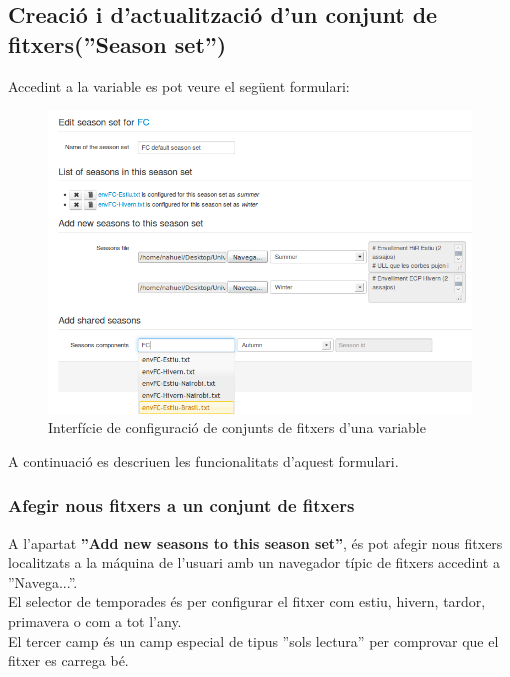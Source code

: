 \subsection{Creació i d'actualització d'un conjunt de fitxers(''Season set'')}
Accedint a la variable es pot veure el següent formulari:\\
\label{season_set:variable}
\begin{figure}[h!]
  \centering
  \includegraphics[scale=0.5]{img/userguide/season_set_edition.png}
  \caption{Interfície de configuraci\'{o} de conjunts de fitxers d'una variable}
  \label{fig:seasonSetEdition}
\end{figure}

A continuació es descriuen les funcionalitats d'aquest formulari.

\subsubsection{Afegir nous fitxers a un conjunt de fitxers}
A l'apartat \textbf{''Add new seasons to this season set''}, \'{e}s pot afegir nous fitxers localitzats a la m\'{a}quina de l'usuari amb un navegador típic de fitxers accedint a ''Navega...''. \\

El selector de temporades \'{e}s per configurar el fitxer com estiu, hivern, tardor, primavera o com a tot l'any.\\

El tercer camp \'{e}s un camp especial de tipus ''sols lectura'' per comprovar que el fitxer es carrega b\'{e}.\\

